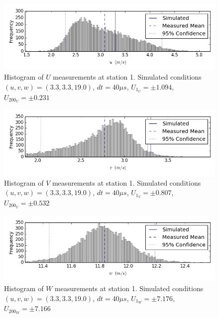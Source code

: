 \begin{figure}[H]
\centering
\includegraphics[width=6in]{figs/Ely_May28th01002/uncertainty_Ely_May28th01002_U}
\caption{Histogram of $U$ measurements at station 1. Simulated conditions $(u,v,w)=(3.3, 3.3, 19.0)$, $dt=40 \mu s$, $U_{1_{U}}=\pm 1.094$, $U_{200_{U}}=\pm 0.231$}
\label{fig:uncertainty_Ely_May28th01002_U}
\end{figure}


\begin{figure}[H]
\centering
\includegraphics[width=6in]{figs/Ely_May28th01002/uncertainty_Ely_May28th01002_V}
\caption{Histogram of $V$ measurements at station 1. Simulated conditions $(u,v,w)=(3.3, 3.3, 19.0)$, $dt=40 \mu s$, $U_{1_{V}}=\pm 0.807$, $U_{200_{V}}=\pm 0.532$}
\label{fig:uncertainty_Ely_May28th01002_V}
\end{figure}


\begin{figure}[H]
\centering
\includegraphics[width=6in]{figs/Ely_May28th01002/uncertainty_Ely_May28th01002_W}
\caption{Histogram of $W$ measurements at station 1. Simulated conditions $(u,v,w)=(3.3, 3.3, 19.0)$, $dt=40 \mu s$, $U_{1_{W}}=\pm 7.176$, $U_{200_{W}}=\pm 7.166$}
\label{fig:uncertainty_Ely_May28th01002_W}
\end{figure}



